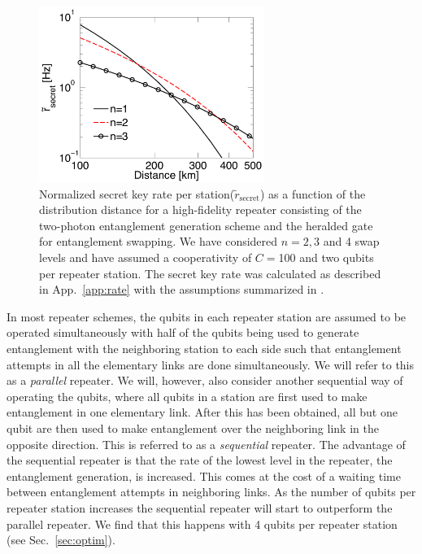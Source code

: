 \begin{figure} 
\centering
\includegraphics[width=0.65\textwidth]{./figs_Borregaard_PRA2015/figureX4}
\caption[Number of swap levels]{Normalized secret key rate per
station($\tilde{r}_{\mathrm{secret}}$) as a function of the distribution distance
for a high-fidelity repeater consisting of the two-photon entanglement
generation scheme and the heralded gate for entanglement swapping.  We have
considered $n=2,3$ and 4 swap levels and have assumed a cooperativity of $C=$100
and two qubits per repeater station. The secret key rate was calculated as
described in App.~\ref{app:rate} with the assumptions summarized in
.  }
\label{fig:figureX4}
\end{figure} 
  
In most repeater schemes, the qubits in each repeater station are assumed to be
operated simultaneously with half of the qubits being used to generate
entanglement with the neighboring station to each side such that entanglement
attempts in all the elementary links are done simultaneously. We will refer to
this as a \emph{parallel} repeater.  We will, however, also consider another
sequential way of operating the qubits, where all qubits in a station are first
used to make entanglement in one elementary link. After this has been obtained,
all but one qubit are then used to make entanglement over the neighboring link
in the opposite direction. This is referred to as a \emph{sequential} repeater.
The advantage of the sequential repeater is that the rate of the lowest level in
the repeater, the entanglement generation, is increased. This comes at the cost
of a waiting time between entanglement attempts in neighboring links. As the
number of qubits per repeater station increases the sequential repeater will
start to outperform the parallel repeater. We find that this happens with 4
qubits per repeater station (see Sec.~\ref{sec:optim}).

